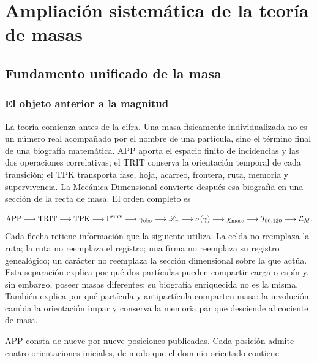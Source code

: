 \chapter{Ampliación sistemática de la teoría de masas}
\section{Fundamento unificado de la masa}
\subsection{El objeto anterior a la magnitud}
La teoría comienza antes de la cifra. Una masa físicamente individualizada no es un número real acompañado por el nombre de una partícula, sino el término final de una biografía matemática. APP aporta el espacio finito de incidencias y las dos operaciones correlativas; el TRIT conserva la orientación temporal de cada transición; el TPK transporta fase, hoja, acarreo, frontera, ruta, memoria y supervivencia. La Mecánica Dimensional convierte después esa biografía en una sección de la recta de masa. El orden completo es

\[
\mathrm{APP}\longrightarrow\mathrm{TRIT}\longrightarrow\mathrm{TPK}
\longrightarrow\Gamma^{\rm surv}
\longrightarrow\gamma_{\rm obs}
\longrightarrow\mathscr L_\gamma
\longrightarrow\sigma(\gamma)
\longrightarrow\chi_{\rm mass}
\longrightarrow\mathcal T_{90,120}
\longrightarrow\mathcal L_M.
\]
Cada flecha retiene información que la siguiente utiliza. La celda no reemplaza la ruta; la ruta no reemplaza el registro; una firma no reemplaza su registro genealógico; un carácter no reemplaza la sección dimensional sobre la que actúa. Esta separación explica por qué dos partículas pueden compartir carga o espín y, sin embargo, poseer masas diferentes: su biografía enriquecida no es la misma. También explica por qué partícula y antipartícula comparten masa: la involución cambia la orientación impar y conserva la memoria par que desciende al cociente de masa.

APP consta de nueve por nueve posiciones publicadas. Cada posición admite cuatro orientaciones iniciales, de modo que el dominio orientado contiene

